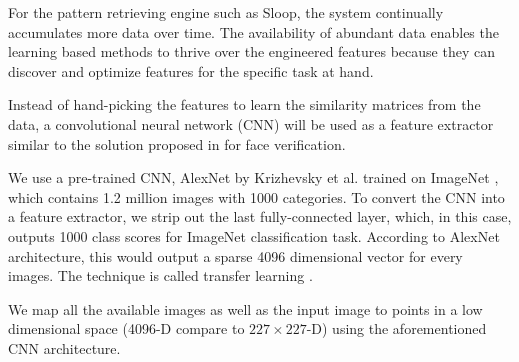For the pattern retrieving engine such as Sloop, the system continually
accumulates more data over time. The availability of abundant data enables the
learning based methods to thrive over the engineered features because they can
discover and optimize features for the specific task at hand.

Instead of hand-picking the features to learn the similarity matrices from the
data, a convolutional neural network (CNN) will be used as a feature extractor
similar to the solution proposed in \cite{chopra05} for face verification.

We use a pre-trained CNN, AlexNet by Krizhevsky et al. \cite{kriz12} trained on
ImageNet \cite{imagenet}, which contains 1.2 million images with 1000
categories. To convert the CNN into a feature extractor, we strip out the last
fully-connected layer, which, in this case, outputs 1000 class scores for
ImageNet classification task. According to AlexNet architecture, this would
output a sparse 4096 dimensional vector for every images. The technique is
called transfer learning \cite{transfer}.

We map all the available images as well as the input image to points in a low
dimensional space (4096-D compare to $227 \times 227$-D) using the
aforementioned CNN architecture. 

